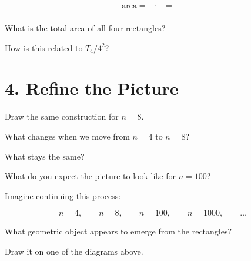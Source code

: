 \documentclass[11pt]{article}
\begin{document}
\[
\text{area}
=
\boxed{\phantom{\frac14}}
\cdot
\boxed{\phantom{\frac24}}
=
\boxed{\phantom{\frac2{16}}}
\]

What is the total area of all four rectangles?

\vspace{0.45in}

How is this related to \(T_4/4^2\)?

\vspace{0.45in}


\section{4. Refine the Picture}

Draw the same construction for \(n=8\).

\begin{center}
\end{center}


What changes when we move from \(n=4\) to \(n=8\)?

\vspace{0.45in}

What stays the same?

\vspace{0.45in}

What do you expect the picture to look like for \(n=100\)?

\vspace{0.45in}


\begin{problem}
Imagine continuing this process:

\[
n=4,\qquad
n=8,\qquad
n=100,\qquad
n=1000,\qquad
\ldots
\]

What geometric object appears to emerge from the rectangles?

Draw it on one of the diagrams above.
\end{problem}
\end{document}
